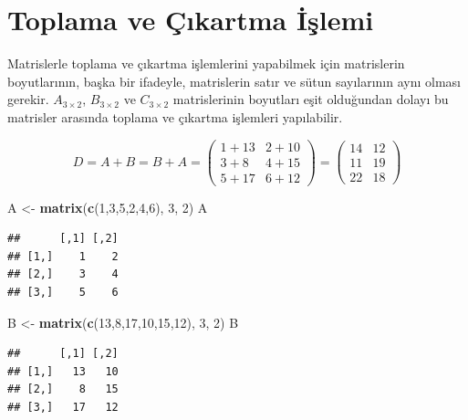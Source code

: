 \documentclass[
]{book}
\newenvironment{Shaded}{\begin{snugshade}}{\end{snugshade}}
\newcommand{\DecValTok}[1]{\textcolor[rgb]{0.00,0.00,0.81}{#1}}
\newcommand{\FunctionTok}[1]{\textcolor[rgb]{0.13,0.29,0.53}{\textbf{#1}}}
\newcommand{\NormalTok}[1]{#1}
\newcommand{\OtherTok}[1]{\textcolor[rgb]{0.56,0.35,0.01}{#1}}
\begin{document}
\section{Toplama ve Çıkartma İşlemi}\label{toplama-ve-uxe7ux131kartma-iux15flemi}

Matrislerle toplama ve çıkartma işlemlerini yapabilmek için matrislerin boyutlarının, başka bir ifadeyle, matrislerin satır ve sütun sayılarının aynı olması gerekir. \(A_{3×2}\), \(B_{3×2}\) ve \(C_{3×2}\) matrislerinin boyutları eşit olduğundan dolayı bu matrisler arasında toplama ve çıkartma işlemleri yapılabilir.

\[D=A+B=B+A=\begin{pmatrix}
 1+13 & 2+10 \\
 3+8 & 4+15 \\
 5+17 & 6+12
\end{pmatrix}
=
\begin{pmatrix}
 14 & 12 \\
 11 & 19 \\
 22 & 18
\end{pmatrix} \]

\begin{Shaded}
\begin{Highlighting}[]
\NormalTok{ A }\OtherTok{\textless{}{-}} \FunctionTok{matrix}\NormalTok{(}\FunctionTok{c}\NormalTok{(}\DecValTok{1}\NormalTok{,}\DecValTok{3}\NormalTok{,}\DecValTok{5}\NormalTok{,}\DecValTok{2}\NormalTok{,}\DecValTok{4}\NormalTok{,}\DecValTok{6}\NormalTok{), }\DecValTok{3}\NormalTok{, }\DecValTok{2}\NormalTok{) }
\NormalTok{ A }
\end{Highlighting}
\end{Shaded}

\begin{verbatim}
##      [,1] [,2]
## [1,]    1    2
## [2,]    3    4
## [3,]    5    6
\end{verbatim}

\begin{Shaded}
\begin{Highlighting}[]
\NormalTok{ B }\OtherTok{\textless{}{-}} \FunctionTok{matrix}\NormalTok{(}\FunctionTok{c}\NormalTok{(}\DecValTok{13}\NormalTok{,}\DecValTok{8}\NormalTok{,}\DecValTok{17}\NormalTok{,}\DecValTok{10}\NormalTok{,}\DecValTok{15}\NormalTok{,}\DecValTok{12}\NormalTok{), }\DecValTok{3}\NormalTok{, }\DecValTok{2}\NormalTok{) }
\NormalTok{ B }
\end{Highlighting}
\end{Shaded}

\begin{verbatim}
##      [,1] [,2]
## [1,]   13   10
## [2,]    8   15
## [3,]   17   12
\end{verbatim}
\end{document}
